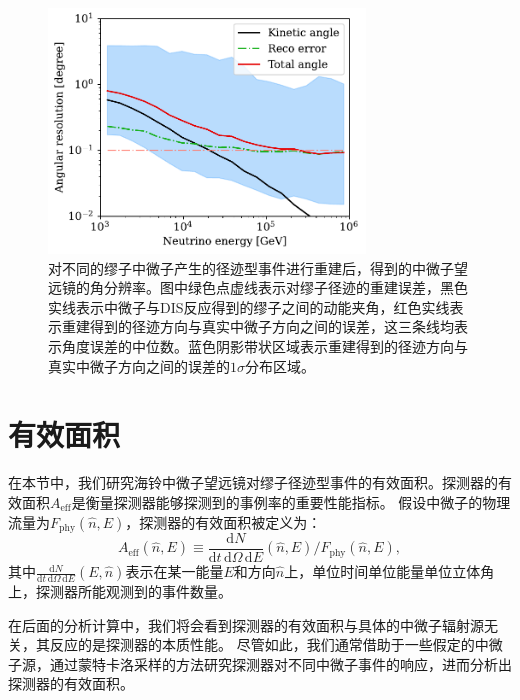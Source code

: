 \begin{figure}[!htb]%
    \centering
    \includegraphics[width=0.75\textwidth]{img/angular_resolsution.pdf}
    \caption{对不同的缪子中微子产生的径迹型事件进行重建后，得到的中微子望远镜的角分辨率。图中绿色点虚线表示对缪子径迹的重建误差，黑色实线表示中微子与DIS反应得到的缪子之间的动能夹角，红色实线表示重建得到的径迹方向与真实中微子方向之间的误差，这三条线均表示角度误差的中位数。蓝色阴影带状区域表示重建得到的径迹方向与真实中微子方向之间的误差的$1\sigma$分布区域。}
    \label{fig:angular_resolsution}
\end{figure}



\section{有效面积}

在本节中，我们研究海铃中微子望远镜对缪子径迹型事件的有效面积。探测器的有效面积$A_\mathrm{eff}$是衡量探测器能够探测到的事例率的重要性能指标。
假设中微子的物理流量为$F_\mathrm{phy}(\hat{n}, E)$，探测器的有效面积被定义为：
\begin{equation}
    A_\mathrm{eff} (\hat{n}, E) \equiv \frac{\mathrm{d}N}{\mathrm{d}t \,\mathrm{d}\Omega \,\mathrm{d}E} (\hat{n}, E) / 
    F_\mathrm{phy}(\hat{n}, E) ,
    \label{eq:eff_area_init}
\end{equation}
其中$\frac{\mathrm{d}N}{\mathrm{d}t \,\mathrm{d}\Omega \,\mathrm{d}E}(E, \hat{n})$表示在某一能量$E$和方向$\hat{n}$上，单位时间单位能量单位立体角上，探测器所能观测到的事件数量。

在后面的分析计算中，我们将会看到探测器的有效面积与具体的中微子辐射源无关，其反应的是探测器的本质性能。
尽管如此，我们通常借助于一些假定的中微子源，通过蒙特卡洛采样的方法研究探测器对不同中微子事件的响应，进而分析出探测器的有效面积。


